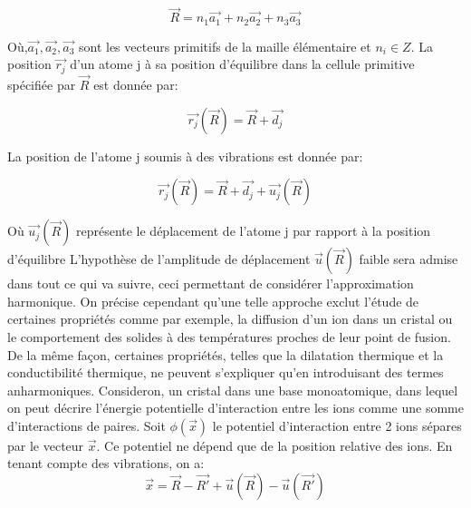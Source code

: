 \documentclass[12pt,a4paper]{book}
\begin{document}
	\begin{equation}
	\overrightarrow{R}= n_{1}\overrightarrow{a_{1}} + n_{2}\overrightarrow{a_{2}} + n_{3}\overrightarrow{a_{3}}
	\end{equation}
	
Où,$\overrightarrow{a_{1}}, \overrightarrow{a_{2}}, \overrightarrow{a_{3}}$ sont les vecteurs primitifs de la maille élémentaire et $n_{i}\in Z$. La position $\overrightarrow{r_{j}}$ d'un atome j à sa position d'équilibre dans la cellule primitive spécifiée par $\overrightarrow{R}$ est donnée par:	

\begin{equation}
\overrightarrow{r_{j}} (\overrightarrow{R}) = \overrightarrow{R} + \overrightarrow{d_{j}}
\end{equation}

La position de l'atome j soumis à des vibrations est donnée par:

\begin{equation}
\overrightarrow{r_{j}} (\overrightarrow{R}) = \overrightarrow{R} + \overrightarrow{d_{j}} + \overrightarrow{u_{j}}(\overrightarrow{R})
\end{equation}	

Où $\overrightarrow{u_{j}}(\overrightarrow{R})$ représente le déplacement de l'atome j par rapport à la position d'équilibre L'hypothèse de l'amplitude de déplacement $\overrightarrow{u}(\overrightarrow{R})$ faible sera admise dans tout ce qui va suivre, ceci permettant de considérer l'approximation harmonique. On précise cependant qu'une telle approche exclut l'étude de certaines propriétés comme par exemple, la diffusion d'un ion dans un cristal ou le comportement des solides à des températures proches de leur point de fusion. De la même façon, certaines propriétés, telles que la dilatation thermique et la conductibilité thermique, ne peuvent s'expliquer qu'en introduisant des termes anharmoniques.
\bigskip
Consideron, un cristal dans une base monoatomique, dans lequel on peut décrire l'énergie potentielle d'interaction entre les ions comme une somme d'interactions de paires. Soit $\phi(\overrightarrow{x})$ le potentiel d'interaction entre 2 ions sépares par le vecteur $\overrightarrow{x}$. Ce potentiel ne dépend que de la position relative des ions. En tenant compte des vibrations, on a: 
\begin{equation}
\overrightarrow{x}= \overrightarrow{R} - \overrightarrow{R'} + \overrightarrow{u}(\overrightarrow{R}) -\overrightarrow{u}(\overrightarrow{R'})
\end{equation}
\end{document}
